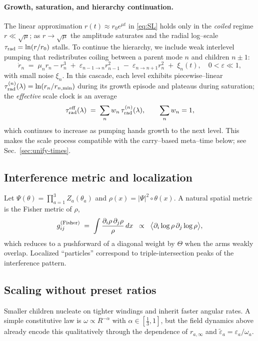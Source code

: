 \documentclass[11pt]{article}
\begin{document}
\paragraph{Growth, saturation, and hierarchy continuation.}
The linear approximation $r(t)\approx r_0 e^{\mu t}$ in \eqref{eq:SL} holds only in the \emph{coiled} regime $r\ll\sqrt{\mu}$; as $r\to\sqrt{\mu}$ the amplitude saturates and the radial log--scale $\tau_{\rm rad}=\ln(r/r_0)$ stalls. To continue the hierarchy, we include weak interlevel pumping that redistributes coiling between a parent mode $n$ and children $n\pm1$:
\begin{equation}
\dot r_n \;=\; \mu_n r_n - r_n^3
\;+\; \varepsilon_{n-1\to n} r_{n-1}^2
\;-\; \varepsilon_{n\to n+1} r_{n}^2
\;+\; \xi_n(t),
\quad 0<\varepsilon\ll 1,
\label{eq:interlevel-pump}
\end{equation}
with small noise $\xi_n$. In this cascade, each level exhibits piecewise--linear $\tau_{\rm rad}^{(n)}(\lambda)=\ln(r_n/r_{n,\min})$ during its growth episode and plateaus during saturation; the \emph{effective} scale clock is an average
\begin{equation}
\tau_{\rm rad}^{\rm eff}(\lambda)\;=\;\sum_{n} w_n\,\tau_{\rm rad}^{(n)}(\lambda),
\qquad \sum_n w_n=1,
\label{eq:tau-rad-eff}
\end{equation}
which continues to increase as pumping hands growth to the next level. This makes the scale process compatible with the carry--based meta--time below; see Sec.~\ref{sec:unify-times}.


\subsection{Interference metric and localization}
Let $\Psi(\theta)\!=\!\prod_{a=1}^{3} Z_a(\theta_a)$ and $\rho(x)\!=\!|\Psi|^2\circ \theta(x)$.
A natural spatial metric is the Fisher metric of $\rho$,
\begin{equation}
g_{ij}^{\rm(Fisher)} \;=\; \int \frac{\partial_i \rho\,\partial_j \rho}{\rho}\,dx \;\;\propto\;\; \big\langle \partial_i\log\rho\,\partial_j\log\rho\big\rangle,
\end{equation}
which reduces to a pushforward of a diagonal weight by $\Theta$ when the arms weakly overlap. Localized ``particles'' correspond to triple-intersection peaks of the interference pattern.

\subsection{Scaling without preset ratios}
Smaller children nucleate on tighter windings and inherit faster angular rates. A simple constitutive law is $\omega\propto R^{-\alpha}$ with $\alpha\!\in\![\tfrac13,1]$, but the field dynamics above already encode this qualitatively through the dependence of $r_{a,\infty}$ and $\tilde\varepsilon_a\!=\!\varepsilon_a/\omega_a$.
\end{document}
